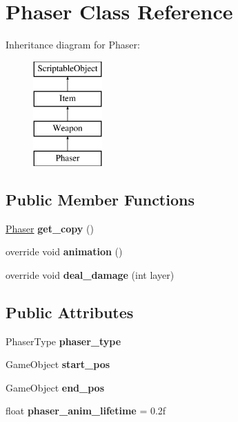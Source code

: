 \hypertarget{class_phaser}{}\section{Phaser Class Reference}
\label{class_phaser}
Inheritance diagram for Phaser\+:\begin{figure}[H]
\begin{center}
\leavevmode
\includegraphics[height=4.000000cm]{class_phaser}
\end{center}
\end{figure}
\subsection*{Public Member Functions}
\begin{DoxyCompactItemize}
\item 
\mbox{\label{class_phaser_afeed8f34e8d5424c4e397830e84d727b}} 
\hyperlink{class_phaser}{Phaser} {\bfseries get\+\_\+copy} ()
\item 
\mbox{\label{class_phaser_ac8038711b4e8e3a3685f2c798157300f}} 
override void {\bfseries animation} ()
\item 
\mbox{\label{class_phaser_a09b78147e6de56f0372eb07a88b99998}} 
override void {\bfseries deal\+\_\+damage} (int layer)
\end{DoxyCompactItemize}
\subsection*{Public Attributes}
\begin{DoxyCompactItemize}
\item 
\mbox{\label{class_phaser_ae87e26eb87e4c22246b98ab5b5469c90}} 
Phaser\+Type {\bfseries phaser\+\_\+type}
\item 
\mbox{\label{class_phaser_addb890658bf4547fae53c61ba7503fa6}} 
Game\+Object {\bfseries start\+\_\+pos}
\item 
\mbox{\label{class_phaser_a5665decd66dc4167e6e437ba0e0cdcc8}} 
Game\+Object {\bfseries end\+\_\+pos}
\item 
\mbox{\label{class_phaser_ab5a677c4a5f5dcf4a669548f36d79423}} 
float {\bfseries phaser\+\_\+anim\+\_\+lifetime} = 0.\+2f
\end{DoxyCompactItemize}
